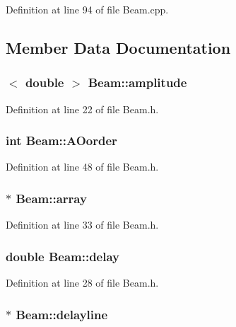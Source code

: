 Definition at line 94 of file Beam.cpp.



\subsection{Member Data Documentation}
\hypertarget{classBeam_ac83b6ebc1b9d745461ba630555636109}{
\subsubsection[{amplitude}]{$<$ double $>$ {\bf Beam::amplitude}}}
\label{classBeam_ac83b6ebc1b9d745461ba630555636109}


Definition at line 22 of file Beam.h.

\hypertarget{classBeam_a2de78a8bf91493e5c0cf0544613d0289}{
\subsubsection[{AOorder}]{\setlength{\rightskip}{0pt plus 5cm}int {\bf Beam::AOorder}}}
\label{classBeam_a2de78a8bf91493e5c0cf0544613d0289}


Definition at line 48 of file Beam.h.

\hypertarget{classBeam_abb5a7f1e41ea63a0e693f6e29e11e16c}{
\subsubsection[{array}]{$\ast$ {\bf Beam::array}}}
\label{classBeam_abb5a7f1e41ea63a0e693f6e29e11e16c}


Definition at line 33 of file Beam.h.

\hypertarget{classBeam_affa1c91c24f15b6acbaae1682b19d9a7}{
\subsubsection[{delay}]{\setlength{\rightskip}{0pt plus 5cm}double {\bf Beam::delay}}}
\label{classBeam_affa1c91c24f15b6acbaae1682b19d9a7}


Definition at line 28 of file Beam.h.

\hypertarget{classBeam_abb779dd249b5a26502a49106aa8023a4}{
\subsubsection[{delayline}]{$\ast$ {\bf Beam::delayline}}}
\label{classBeam_abb779dd249b5a26502a49106aa8023a4}


